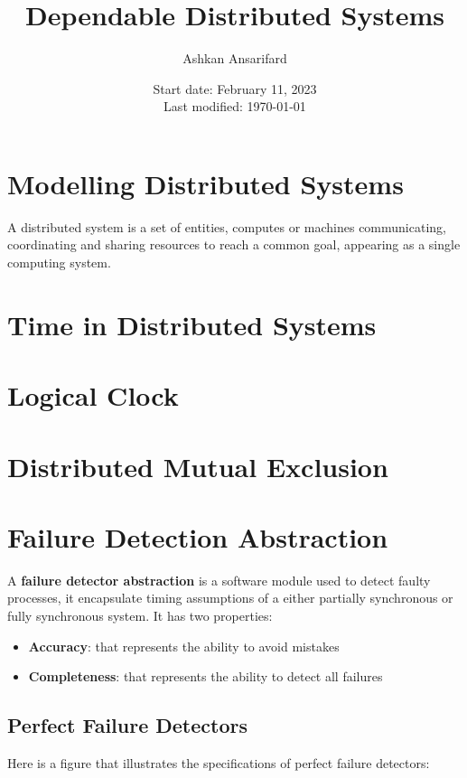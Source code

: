 \documentclass{article}
\title{Dependable Distributed Systems}
\author{Ashkan Ansarifard}
\date{Start date: February 11, 2023 \\ Last modified: \today}
\begin{document}
	
	\maketitle
	\newpage
	\tableofcontents
	
	\newpage
	\newpage
	\section{Modelling Distributed Systems}
	A distributed system is a set of entities, computes or machines communicating, coordinating and sharing resources to reach a common goal, appearing as a single computing system.
	
	\newpage
	\section{Time in Distributed Systems}
	
	\newpage
	\section{Logical Clock}
	
	\newpage
	\section{Distributed Mutual Exclusion}
	
	\newpage
	\section{Failure Detection Abstraction}
	A \textbf{failure detector abstraction} is a software module used to detect faulty processes, it encapsulate timing assumptions of a either partially synchronous or fully synchronous system. It has two properties:
	\begin{itemize}
		\item \textbf{Accuracy}: that represents the ability to avoid mistakes
		\item \textbf{Completeness}: that represents the ability to detect all failures
	\end{itemize}
	
	\subsection{Perfect Failure Detectors}
	\label{sec:perfect-failure-detectors}
	Here is a figure that illustrates the specifications of perfect failure detectors:
\end{document}
